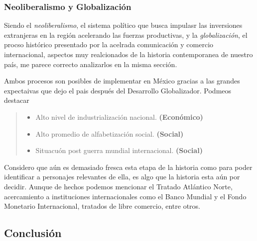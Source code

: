 \documentclass[12pt]{article}
\begin{document}
	\subsubsection*{Neoliberalismo y Globalizaci\'on}
	
	\par Siendo el \textit{neoliberalismo}, el sistema pol\'itico que busca impulasr las inversiones extranjeras en la regi\'on acelerando las fuerzas productivas, y la \textit{globalizaci\'on}, el procso hist\'orico presentado por la acelrada comunicaci\'on y comercio internacional, aspectos muy realcionados de la historia contemporanea de nuestro pa\'is, me parece correcto analizarlos en la misma secci\'on. 
	
	\par Ambos procesos son posibles de implementar en M\'exico gracias a las grandes expectaivas que dejo el pais despu\'es del Desarrollo Globalizador. Podmeos destacar
	\begin{quote}\begin{itemize}
		\item Alto nivel de industrializaci\'on nacional. \textbf{(Econ\'omico)}
		\item Alto promedio de alfabetizaci\'on social. \textbf{(Social)}
		\item Situacu\'on post guerra mundial internacional. \textbf{(Social)}
	\end{itemize}\end{quote}
	
	\par Considero que a\'un es demasiado fresca esta etapa de la historia como para poder identificar a personajes relevantes de ella, es algo que la historia esta a\'un por decidir. Aunque de hechos podemos mencionar el Tratado Atl\'antico Norte, acercamiento a instituciones internacionales como el Banco Mundial y el Fondo Monetario Internacional, tratados de libre comercio, entre otros.




\subsection*{Conclusi\'on}
\end{document}
